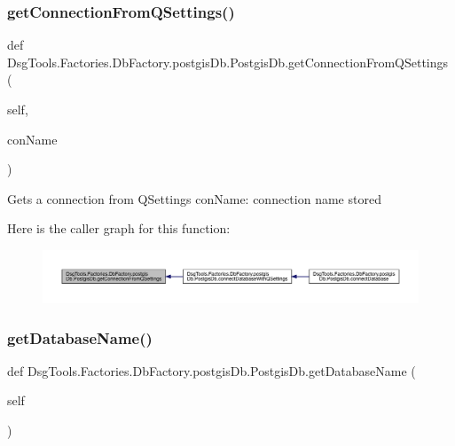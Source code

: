 \subsubsection{\texorpdfstring{get\+Connection\+From\+Q\+Settings()}{getConnectionFromQSettings()}}
{\footnotesize\ttfamily def Dsg\+Tools.\+Factories.\+Db\+Factory.\+postgis\+Db.\+Postgis\+Db.\+get\+Connection\+From\+Q\+Settings (\begin{DoxyParamCaption}\item[{}]{self,  }\item[{}]{con\+Name }\end{DoxyParamCaption})}

\begin{DoxyVerb}Gets a connection from QSettings
conName: connection name stored
\end{DoxyVerb}
 Here is the caller graph for this function\+:
\nopagebreak
\begin{figure}[H]
\begin{center}
\leavevmode
\includegraphics[width=350pt]{class_dsg_tools_1_1_factories_1_1_db_factory_1_1postgis_db_1_1_postgis_db_afe374d35d99247bce7b727441e0287e8_icgraph}
\end{center}
\end{figure}
\mbox{\label{class_dsg_tools_1_1_factories_1_1_db_factory_1_1postgis_db_1_1_postgis_db_ad5c022a496123d2de6ab43faf16819f0}} 
\subsubsection{\texorpdfstring{get\+Database\+Name()}{getDatabaseName()}}
{\footnotesize\ttfamily def Dsg\+Tools.\+Factories.\+Db\+Factory.\+postgis\+Db.\+Postgis\+Db.\+get\+Database\+Name (\begin{DoxyParamCaption}\item[{}]{self }\end{DoxyParamCaption})}

